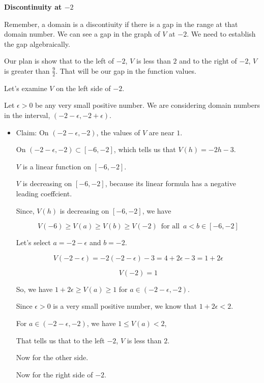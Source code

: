 \documentclass{ximera}
\begin{document}
\begin{explanation} \textbf{\textcolor{red!75!green}{Discontinuity at $-2$}} 


Remember, a domain is a discontiuity if there is a gap in the range at that domain number.  We can see a gap in the graph of $V$ at $-2$.  We need to establish the gap algebraically.

Our plan is show that to the left of $-2$, $V$ is less than $2$ and to the right of $-2$, $V$ is greater than $\frac{9}{2}$. That will be our gap in the function values.  



Let's examine $V$ on the left side of $-2$.


Let $\epsilon > 0$ be any very small positive number.  We are considering domain numbers in the interval, $(-2 - \epsilon, -2 + \epsilon)$.


\begin{itemize}
\item Claim: On $(-2 - \epsilon, -2)$, the values of $V$ are near $1$. 


On $(-2 - \epsilon, -2) \subset [-6, -2]$, which tells us that $V(h) = -2h-3$.

$V$ is a linear function on $[-6, -2]$.

$V$ is decreasing on $[-6, -2]$, because its linear formula has a negative leading coeffcient.


Since, $V(h)$ is decreasing on $[-6, -2]$, we have  

\[ V(-6) \geq V(a) \geq V(b) \geq V(-2) \, \text{ for all } \, a < b \in [-6, -2] \]

Let's select $a = -2 - \epsilon$ and $b = -2$. 

\[
V(-2 - \epsilon) = -2 (-2 - \epsilon) - 3 = 4 + 2 \epsilon - 3 = 1 + 2 \epsilon 
\]

\[
V(-2) = 1
\]



So, we have $1 + 2\epsilon \geq V(a) \geq 1$ for $a \in (-2 - \epsilon, -2)$.

Since $\epsilon > 0$ is a very small positive number, we know that $1 + 2\epsilon < 2$.


For $a \in (-2 - \epsilon, -2)$, we have $1 \leq V(a) < 2$,



That tells us that to the left $-2$, $V$ is less than $2$.

Now for the other side. 

Now for the right side of $-2$.











\end{itemize}
\end{explanation}
\end{document}
